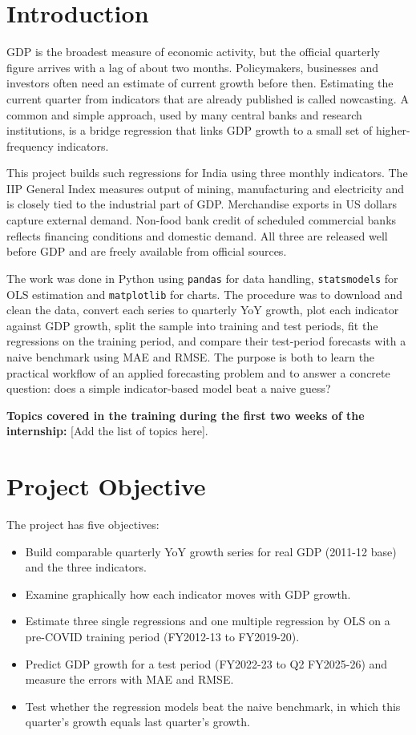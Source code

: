 \documentclass[11pt, a4paper]{article}
\begin{document}
\section{Introduction}
GDP is the broadest measure of economic activity, but the official quarterly figure arrives with a lag of about two months. Policymakers, businesses and investors often need an estimate of current growth before then. Estimating the current quarter from indicators that are already published is called nowcasting. A common and simple approach, used by many central banks and research institutions, is a bridge regression that links GDP growth to a small set of higher-frequency indicators.

This project builds such regressions for India using three monthly indicators. The IIP General Index measures output of mining, manufacturing and electricity and is closely tied to the industrial part of GDP. Merchandise exports in US dollars capture external demand. Non-food bank credit of scheduled commercial banks reflects financing conditions and domestic demand. All three are released well before GDP and are freely available from official sources.

The work was done in Python using \texttt{pandas} for data handling, \texttt{statsmodels} for OLS estimation and \texttt{matplotlib} for charts. The procedure was to download and clean the data, convert each series to quarterly YoY growth, plot each indicator against GDP growth, split the sample into training and test periods, fit the regressions on the training period, and compare their test-period forecasts with a naive benchmark using MAE and RMSE. The purpose is both to learn the practical workflow of an applied forecasting problem and to answer a concrete question: does a simple indicator-based model beat a naive guess?

\textbf{Topics covered in the training during the first two weeks of the internship:} [Add the list of topics here].

\section{Project Objective}
The project has five objectives:
\begin{itemize}
    \item Build comparable quarterly YoY growth series for real GDP (2011-12 base) and the three indicators.
    \item Examine graphically how each indicator moves with GDP growth.
    \item Estimate three single regressions and one multiple regression by OLS on a pre-COVID training period (FY2012-13 to FY2019-20).
    \item Predict GDP growth for a test period (FY2022-23 to Q2 FY2025-26) and measure the errors with MAE and RMSE.
    \item Test whether the regression models beat the naive benchmark, in which this quarter's growth equals last quarter's growth.
\end{itemize}
\end{document}
